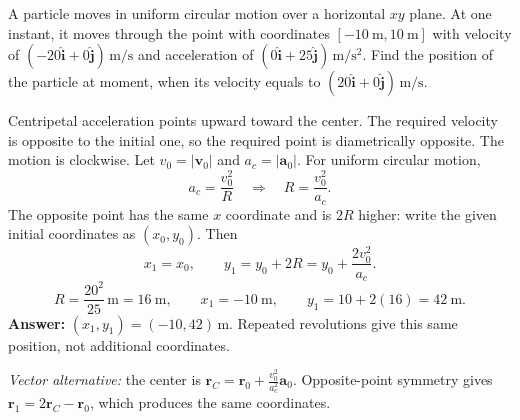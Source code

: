 \quiznextproblem
\begin{problem}[25 pts]
A particle moves in uniform circular motion over a horizontal $xy$ plane.
At one instant, it moves through the point with coordinates
$[\qty{-10}{\metre},\qty{10}{\metre}]$ with velocity of
$(-20\hat{\mathbf i}+0\hat{\mathbf j})\,\unit{\metre\per\second}$
and acceleration of
$(0\hat{\mathbf i}+25\hat{\mathbf j})\,\unit{\metre\per\second\squared}$.
Find the position of the particle at moment, when its velocity equals to
$(20\hat{\mathbf i}+0\hat{\mathbf j})\,\unit{\metre\per\second}$.
\end{problem}
\begin{solution}
Centripetal acceleration points upward toward the center.
The required velocity is opposite to the initial one, so the required
point is diametrically opposite. The motion is clockwise.
Let $v_0=|\mathbf v_0|$ and $a_c=|\mathbf a_0|$.
For uniform circular motion,
\[
a_c=\frac{v_0^2}{R}\quad\Longrightarrow\quad R=\frac{v_0^2}{a_c}.
\]
The opposite point has the same $x$ coordinate and is $2R$ higher:
write the given initial coordinates as $(x_0,y_0)$. Then
\[
x_1=x_0,\qquad y_1=y_0+2R=y_0+\frac{2v_0^2}{a_c}.
\]
\[
R=\frac{20^2}{25}\,\unit{\metre}=\qty{16}{\metre},\qquad
x_1=-\qty{10}{\metre},\qquad
y_1=10+2(16)=\qty{42}{\metre}.
\]
\textbf{Answer:} $(x_1,y_1)=(-10,42)\,\unit{\metre}$.
Repeated revolutions give this same position, not additional coordinates.

\textit{Vector alternative:} the center is
$\mathbf r_C=\mathbf r_0+\frac{v_0^2}{a_c^2}\mathbf a_0$.
Opposite-point symmetry gives $\mathbf r_1=2\mathbf r_C-\mathbf r_0$,
which produces the same coordinates.
\end{solution}
